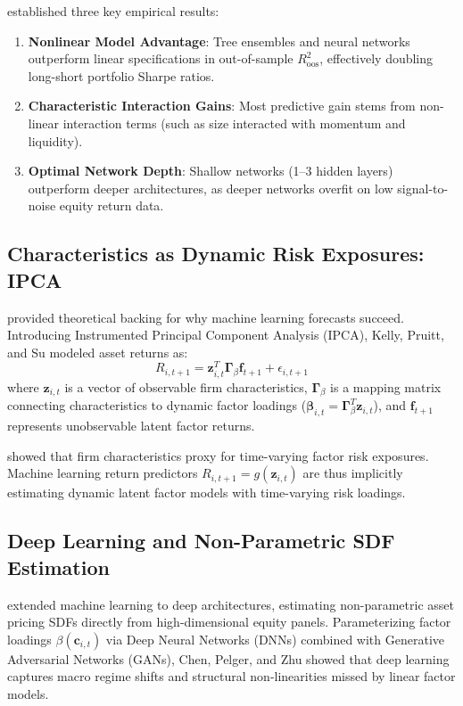 \citet{gu2020empirical} established three key empirical results:
\begin{enumerate}
    \item \textbf{Nonlinear Model Advantage}: Tree ensembles and neural networks outperform linear specifications in out-of-sample $R_{\text{oos}}^2$, effectively doubling long-short portfolio Sharpe ratios.
    \item \textbf{Characteristic Interaction Gains}: Most predictive gain stems from non-linear interaction terms (such as size interacted with momentum and liquidity).
    \item \textbf{Optimal Network Depth}: Shallow networks (1--3 hidden layers) outperform deeper architectures, as deeper networks overfit on low signal-to-noise equity return data.
\end{enumerate}

\subsection{Characteristics as Dynamic Risk Exposures: IPCA}
\citet{kelly2019characteristics} provided theoretical backing for why machine learning forecasts succeed. Introducing Instrumented Principal Component Analysis (IPCA), Kelly, Pruitt, and Su modeled asset returns as:
\begin{equation}
R_{i,t+1} = \mathbf{z}_{i,t}^T \mathbf{\Gamma}_{\beta} \mathbf{f}_{t+1} + \epsilon_{i,t+1}
\label{eq:ch2_ipca}
\end{equation}
where $\mathbf{z}_{i,t}$ is a vector of observable firm characteristics, $\mathbf{\Gamma}_{\beta}$ is a mapping matrix connecting characteristics to dynamic factor loadings ($\boldsymbol{\beta}_{i,t} = \mathbf{\Gamma}_{\beta}^T \mathbf{z}_{i,t}$), and $\mathbf{f}_{t+1}$ represents unobservable latent factor returns.

\citet{kelly2019characteristics} showed that firm characteristics proxy for time-varying factor risk exposures. Machine learning return predictors $R_{i,t+1} = g(\mathbf{z}_{i,t})$ are thus implicitly estimating dynamic latent factor models with time-varying risk loadings.

\subsection{Deep Learning and Non-Parametric SDF Estimation}
\citet{chen2023deep} extended machine learning to deep architectures, estimating non-parametric asset pricing SDFs directly from high-dimensional equity panels. Parameterizing factor loadings $\beta(\mathbf{c}_{i,t})$ via Deep Neural Networks (DNNs) combined with Generative Adversarial Networks (GANs), Chen, Pelger, and Zhu showed that deep learning captures macro regime shifts and structural non-linearities missed by linear factor models.

